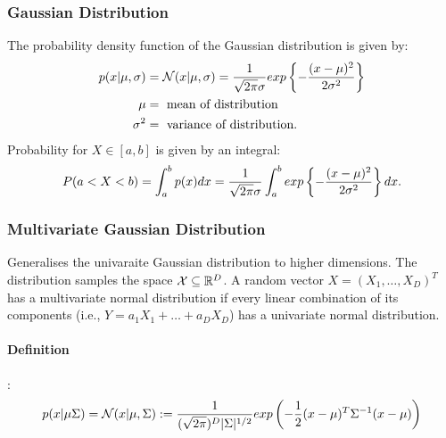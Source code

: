 \subsubsection{Gaussian Distribution}
The probability density function of the Gaussian distribution is given by:
\begin{align*}
    p(x|\mu, \sigma) &= \mathcal N(x|\mu, \sigma) = {1\over \sqrt{2\pi} \sigma} exp \left\{ - {(x-\mu)^2 \over 2\sigma^2 }\right\}\\
    \mu &= \text{ mean of distribution}\\
    \sigma^2 &= \text{ variance of distribution}.
\end{align*}
Probability for $X\in [a,b]$ is given by an integral:
\begin{align*}
    P(a<X<b) = \int_a^b p(x) dx = {1\over \sqrt{2\pi}\sigma} \int_a^b exp \left\{ - {(x-\mu)^2 \over 2\sigma^2 }\right\} dx.
\end{align*}

\subsubsection{Multivariate Gaussian Distribution}
Generalises the univaraite Gaussian distribution to higher dimensions. The distribution samples the space $\mathcal X \subseteq \mathbb{R}^D$. A random vector $X=(X_1, \ldots, X_D)^T$ has a multivariate normal distribution if every linear combination of its components (i.e., $Y=a_1X_1+\ldots+ a_DX_D$) has a univariate normal distribution.

\paragraph{Definition}:
\begin{align*}
    p(x|\mu\Sigma) = \mathcal N(x|\mu, \Sigma) := {1\over (\sqrt{2\pi})^D |\Sigma|^{1/2} } exp \left( -{1\over 2} (x-\mu)^T \Sigma^{-1} (x-\mu)\right)
\end{align*}

